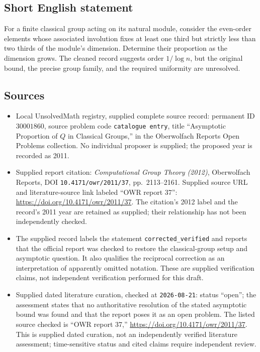 \documentclass[11pt]{article}
\begin{document}
\subsection{Short English statement}
For a finite classical group acting on its natural module, consider the even-order elements whose associated involution fixes at least one third but strictly less than two thirds of the module's dimension. Determine their proportion as the dimension grows. The cleaned record suggests order \(1/\log n\), but the original bound, the precise group family, and the required uniformity are unresolved.
\subsection{Sources}
\begin{itemize}
\item Local UnsolvedMath registry, supplied complete source record: permanent ID \(30001860\), source problem code \texttt{catalogue entry}, title ``Asymptotic Proportion of \(Q\) in Classical Groups,'' in the Oberwolfach Reports Open Problems collection. No individual proposer is supplied; the proposed year is recorded as 2011.
\item Supplied report citation: \emph{Computational Group Theory (2012)}, Oberwolfach Reports, DOI \texttt{10.4171/owr/2011/37}, pp.\ 2113--2161. Supplied source URL and literature-source link labeled ``OWR report 37'': \url{https://doi.org/10.4171/owr/2011/37}. The citation's 2012 label and the record's 2011 year are retained as supplied; their relationship has not been independently checked.
\item The supplied record labels the statement \texttt{corrected\_verified} and reports that the official report was checked to restore the classical-group setup and asymptotic question. It also qualifies the reciprocal correction as an interpretation of apparently omitted notation. These are supplied verification claims, not independent verification performed for this draft.
\item Supplied dated literature curation, checked at \texttt{2026-08-21}: status ``open''; the assessment states that no authoritative resolution of the stated asymptotic bound was found and that the report poses it as an open problem. The listed source checked is ``OWR report 37,'' \url{https://doi.org/10.4171/owr/2011/37}. This is supplied dated curation, not an independently verified literature assessment; time-sensitive status and cited claims require independent review.
\end{itemize}
\end{document}
